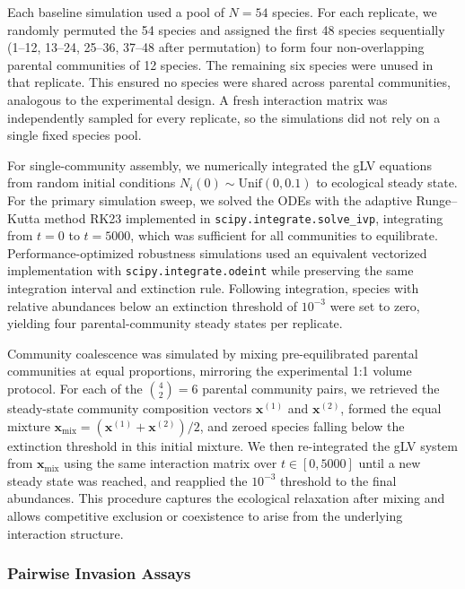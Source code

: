 Each baseline simulation used a pool of $N = 54$ species. For each replicate, we randomly permuted the 54 species and assigned the first 48 species sequentially (1--12, 13--24, 25--36, 37--48 after permutation) to form four non-overlapping parental communities of 12 species. The remaining six species were unused in that replicate. This ensured no species were shared across parental communities, analogous to the experimental design. A fresh interaction matrix was independently sampled for every replicate, so the simulations did not rely on a single fixed species pool.

For single-community assembly, we numerically integrated the gLV equations from random initial conditions $N_i(0) \sim \text{Unif}(0, 0.1)$ to ecological steady state. For the primary simulation sweep, we solved the ODEs with the adaptive Runge--Kutta method RK23 implemented in \texttt{scipy.integrate.solve\_ivp}, integrating from $t = 0$ to $t = 5000$, which was sufficient for all communities to equilibrate. Performance-optimized robustness simulations used an equivalent vectorized implementation with \texttt{scipy.integrate.odeint} while preserving the same integration interval and extinction rule. Following integration, species with relative abundances below an extinction threshold of $10^{-3}$ were set to zero, yielding four parental-community steady states per replicate.

Community coalescence was simulated by mixing pre-equilibrated parental communities at equal proportions, mirroring the experimental 1:1 volume protocol. For each of the $\binom{4}{2} = 6$ parental community pairs, we retrieved the steady-state community composition vectors $\mathbf{x}^{(1)}$ and $\mathbf{x}^{(2)}$, formed the equal mixture $\mathbf{x}_{\text{mix}} = (\mathbf{x}^{(1)} + \mathbf{x}^{(2)})/2$, and zeroed species falling below the extinction threshold in this initial mixture. We then re-integrated the gLV system from $\mathbf{x}_{\text{mix}}$ using the same interaction matrix over $t \in [0, 5000]$ until a new steady state was reached, and reapplied the $10^{-3}$ threshold to the final abundances. This procedure captures the ecological relaxation after mixing and allows competitive exclusion or coexistence to arise from the underlying interaction structure.


\subsubsection*{Pairwise Invasion Assays}
\label{sec:suppl:methods:invasion}

